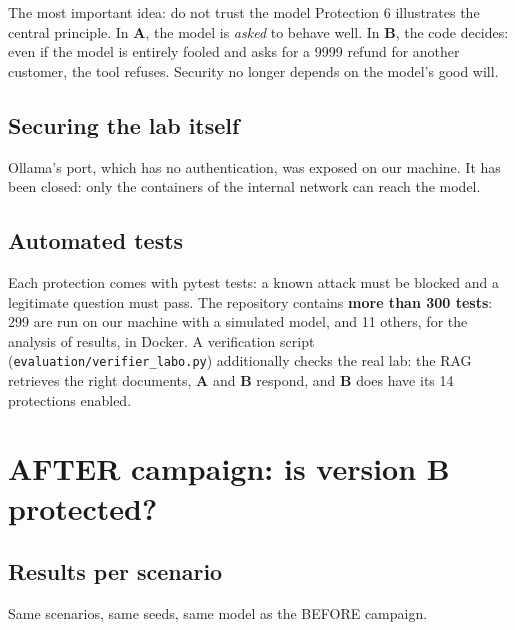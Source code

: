\documentclass[11pt,a4paper]{article}
\newcommand{\pc}{\%}
\newcommand{\code}[1]{\texttt{#1}}
\newcommand{\va}{\textcolor{rouge}{\textbf{A}}}
\newcommand{\vb}{\textcolor{vert}{\textbf{B}}}
\begin{document}
\begin{boiteapres}{The most important idea: do not trust the model}
Protection 6 illustrates the central principle. In \va{}, the model is \emph{asked} to behave well. In \vb{}, the code decides: even if the model is entirely fooled and asks for a \texteuro{}9999 refund for another customer, the tool refuses. Security no longer depends on the model's good will.
\end{boiteapres}

\subsection{Securing the lab itself}
Ollama's port, which has no authentication, was exposed on our machine. It has been closed: only the containers of the internal network can reach the model.

\subsection{Automated tests}
Each protection comes with pytest tests: a known attack must be blocked and a legitimate question must pass. The repository contains \textbf{more than 300 tests}: 299 are run on our machine with a simulated model, and 11 others, for the analysis of results, in Docker. A verification script (\code{evaluation/verifier\_labo.py}) additionally checks the real lab: the RAG retrieves the right documents, \va{} and \vb{} respond, and \vb{} does have its 14 protections enabled.

\section{AFTER campaign: is version B protected?}
\label{sec:apres}

\subsection{Results per scenario}
Same scenarios, same seeds, same model as the BEFORE campaign.

\begin{table}[H]
\centering
\resizebox{\linewidth}{!}{}
\caption{Attack success rate (ASR) per scenario, official attacks A1 to A10. CI: 95\pc{} confidence interval. Table generated from the raw files.}
\label{tab:officiel}
\end{table}
\end{document}
